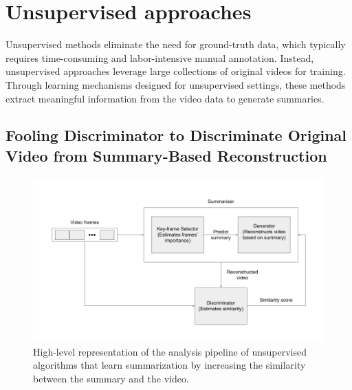 \section{Unsupervised approaches} 
\label{section:rel-unsupervised} 

Unsupervised methods eliminate the need for ground-truth data, which typically requires time-consuming and labor-intensive manual annotation. Instead, unsupervised approaches leverage large collections of original videos for training. Through learning mechanisms designed for unsupervised settings, these methods extract meaningful information from the video data to generate summaries.

\subsection{Fooling Discriminator to Discriminate Original Video from Summary-Based Reconstruction}
\label{section:rel-unsup-discriminative}

\begin{figure}[ht]
    \centering
    \includegraphics[width=0.73\paperwidth]{content/related/figures/unsup-gan.png}
    \caption{High-level representation of the analysis pipeline of unsupervised
    algorithms that learn summarization by increasing the similarity between the
    summary and the video.}
    \label{figure:rel-unsup-gan}
  \end{figure}

